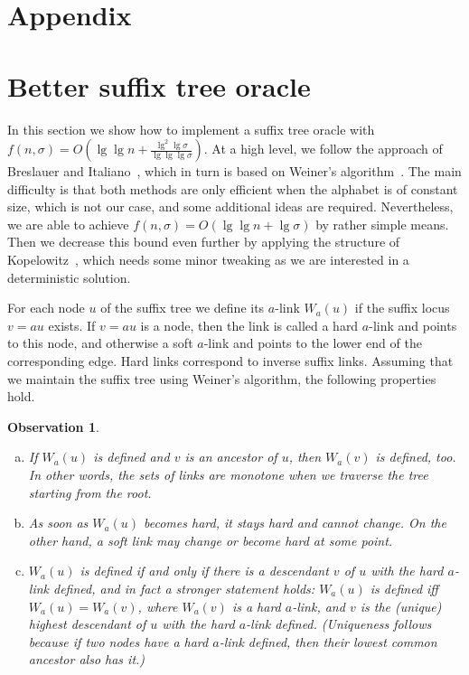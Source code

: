 \documentclass[11pt,onecolumn,final]{article} \usepackage{a4}
\theoremstyle{plain}
\newtheorem{observation}[definition]{Observation}
\theoremstyle{remark}
\begin{document}
\section*{Appendix}
\appendix
\section{Better suffix tree oracle}

In this section we show how to implement a suffix tree oracle with $f(n,\sigma)=O(\lg\lg n + \frac{\lg^2\lg \sigma}{\lg\lg\lg \sigma})$. At a high level, we follow the approach of Breslauer and Italiano~\cite{Breslauer11fringe}, which in turn is based on Weiner's algorithm~\cite{weiner73linear}. The main difficulty is that both methods are only efficient when the alphabet is of constant size, which is not our case, and some additional ideas are required. Nevertheless, we are able to achieve $f(n,\sigma)=O(\lg\lg n+\lg\sigma)$ by rather simple means. Then we decrease this bound even further by applying the structure of Kopelowitz~\cite{Kopelot12indexing}, which needs some minor tweaking as we are interested in a deterministic solution.

For each node $u$ of the suffix tree we define its $a$-link $W_a(u)$ if the suffix locus $v=au$ exists. If $v=au$ is a node, then the link is called a hard $a$-link and points to this node, and otherwise a soft $a$-link and points to the lower end of the corresponding edge. Hard links correspond to inverse suffix links. Assuming that we maintain the suffix tree using Weiner's algorithm, the following properties hold.

\begin{observation}
\begin{enumerate}[(a)]
\item\label{obs:monotone} If $W_a(u)$ is defined and $v$ is an ancestor of $u$, then $W_a(v)$ is defined, too. In other words, the sets of links are monotone when we traverse the tree starting from the root.
\item\label{obs:change} As soon as $W_a(u)$ becomes hard, it stays hard and cannot change. On the other hand, a soft link may change or become hard at some point.
\item\label{obs:reconstruct} $W_a(u)$ is defined if and only if there is a descendant $v$ of $u$ with the hard $a$-link defined, and in fact a stronger statement holds: $W_a(u)$ is defined iff $W_a(u)=W_a(v)$, where $W_a(v)$ is a hard $a$-link, and $v$ is the (unique) highest descendant of $u$ with the hard $a$-link defined. (Uniqueness follows because if two nodes have a hard $a$-link defined, then their lowest common ancestor also has it.)
\end{enumerate}
\end{observation}
\end{document}
